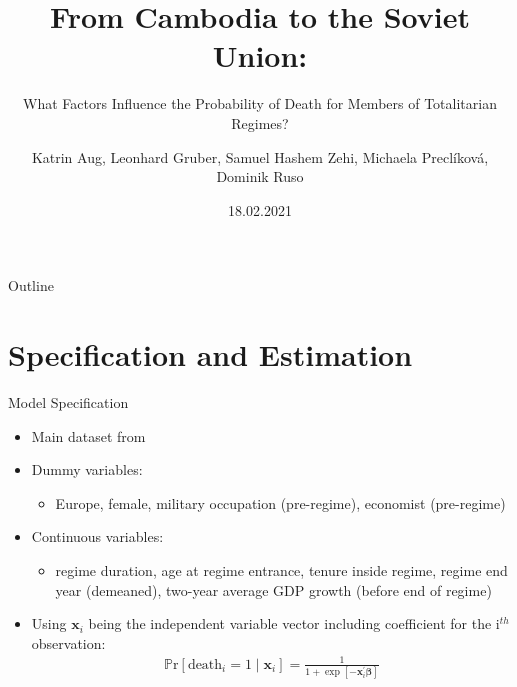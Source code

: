\documentclass{beamer}
\title{From Cambodia to the Soviet Union:}
\subtitle
{What Factors Influence the Probability of Death for Members of Totalitarian Regimes?} %
\author[ ]{Katrin Aug, Leonhard Gruber, Samuel Hashem Zehi, Michaela Preclíková, Dominik Ruso}
\date{18.02.2021}
\begin{document}
\begin{frame}
  \titlepage
\end{frame}

\begin{frame}{Outline}
  \tableofcontents
\end{frame}
\section{Specification and Estimation}
\begin{frame}{Model Specification}
	\begin{itemize}
	\item Main dataset from \cite{Matthews.2019}
	\item Dummy variables:
		\begin{itemize}
		\item Europe, female, military occupation (pre-regime), economist (pre-regime) 
		\end{itemize}
	\item Continuous variables:	
		\begin{itemize}
		\item regime duration, age at regime entrance, tenure inside regime, regime end year (demeaned), two-year average GDP growth (before end of regime)
		\end{itemize}
	\item Using $\mathbf x_i$ being the independent variable vector including coefficient for the i$^{th}$ observation:	
	\begin{align*}
	\mathbb P\text{r}[\text{death}_i = 1 \mid \mathbf x_i] = \frac{1}{1+\exp[-\mathbf x_i^\prime \bm\beta]}
	\end{align*}	
	\end{itemize}
\end{frame}
\end{document}
